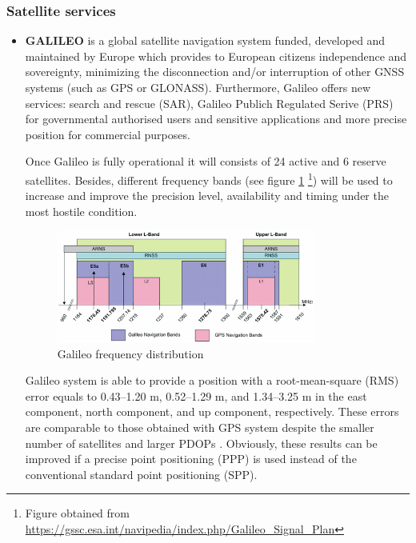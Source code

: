 \subsubsection{Satellite services}
\begin{itemize}
    \item \textbf{GALILEO} \color{blue} is a global satellite navigation system funded, developed and maintained by Europe which provides to European citizens independence and sovereignty, minimizing the disconnection and/or interruption of other GNSS systems (such as GPS or GLONASS). Furthermore, Galileo offers new services: search and rescue (SAR), Galileo Publich Regulated Serive (PRS) for governmental authorised users and sensitive applications and more precise position for commercial purposes.   
    
    Once Galileo is fully operational it will consists of 24 active and 6 reserve satellites. Besides, different frequency bands (see figure \ref{fig:frequency_plan} \footnote{Figure obtained from \url{https://gssc.esa.int/navipedia/index.php/Galileo_Signal_Plan}}) will be used to increase and improve the precision level, availability and timing under the most hostile condition. 
    
    \begin{figure}
    	\centering
    	\includegraphics[width=0.8\textwidth]{images/Galileo_Frequency_Plan.png}
    	\caption{Galileo frequency distribution}
    	\label{fig:frequency_plan}
    \end{figure} 
    
    Galileo system is able to provide a position with a root-mean-square (RMS) error equals to 0.43–1.20 m, 0.52–1.29 m, and 1.34–3.25 m in the east component, north component, and up component, respectively. These errors are comparable to those obtained with GPS system despite the smaller number of satellites and larger PDOPs \cite{Gal_pos}. Obviously, these results can be improved if a precise point positioning (PPP) is used instead of the conventional standard point positioning (SPP). 


\end{itemize}
